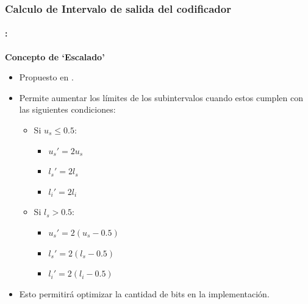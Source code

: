 \begin{frame}
  \frametitle{\textbf{Calculo de Intervalo de salida del  codificador}}
\framesubtitle{\secname : \subsecname}
   \begin{block}{\centering \textbf{Concepto de `Escalado'}}
       \begin{itemize}\Small
            \item Propuesto en \cite[Sec.\ 4]{schulte}.
            \item Permite aumentar los límites de los subintervalos cuando estos cumplen con las siguientes condiciones:
            \begin{itemize}\footnotesize
                \item Si $u_s \leq 0.5$:
                    \begin{itemize}
                        \item $u_s' = 2  u_s$
                        \item $l_s' = 2 l_s$
                        \item $l_i' = 2  l_i$
                    \end{itemize}
                \item Si $l_s > 0.5$: 
                    \begin{itemize}
                        \item $u_s' = 2  (u_s - 0.5)$
                        \item $l_s' = 2  (l_s - 0.5)$
                        \item $l_i' = 2  (l_i - 0.5)$
                    \end{itemize}
            \end{itemize}
            \item Esto permitirá optimizar la cantidad de bits en la implementación.
        \end{itemize}
  \end{block}
\end{frame}


